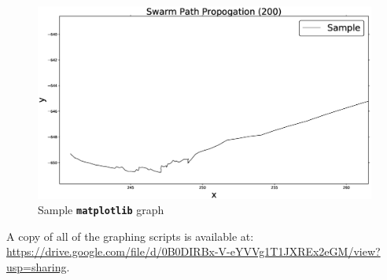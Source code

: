\begin{figure}[H]
\begin{center}
\includegraphics[width=15cm]{CHAPTER-3/figures/SampleGraph}
\end{center}
\caption[Sample graph]{Sample \texttt{\textbf{matplotlib}} graph}\label{sim:sampleGraph}
\end{figure}

A copy of all of the graphing scripts is available at: \url{https://drive.google.com/file/d/0B0DIRBx-V-eYVVg1T1JXREx2eGM/view?usp=sharing}.
